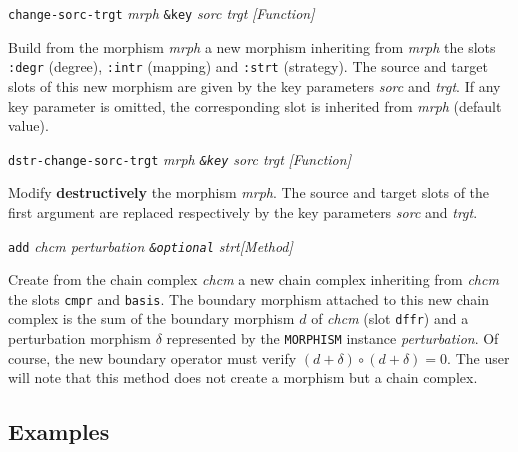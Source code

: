 \newpage
{\parindent=0mm
{\leftskip=5mm 
{\tt change-sorc-trgt} {\em mrph} {\tt \&key} {\em sorc trgt} \hfill {\em [Function]} \par}
{\leftskip=15mm 
Build from the morphism {\em mrph} a new morphism inheriting from
{\em mrph} the slots {\tt :degr} (degree), {\tt :intr} (mapping) and 
{\tt :strt} (strategy). The source  and target slots of this new morphism are given
by the key parameters {\em sorc} and {\em trgt}. If any 
key parameter is omitted, the corresponding slot is
inherited from {\em mrph} (default value). \par}
{\leftskip=5mm 
{\tt dstr-change-sorc-trgt} {\em mrph {\tt \&key}  sorc trgt} \hfill {\em [Function]} \par}
{\leftskip=15mm 
Modify {\bf destructively} the morphism {\em mrph}. The source  and target slots of the first argument
are replaced respectively by the key parameters {\em sorc} and {\em trgt}. \par}
{\leftskip=5mm 
{\tt add} {\em chcm perturbation {\tt \&optional} strt}\hfill {\em [Method]} \par}
{\leftskip=15mm 
Create from the chain complex {\em chcm} a new chain complex inheriting
from {\em chcm} the slots {\tt cmpr} and {\tt basis}. The boundary morphism
attached to this new chain complex  is the sum of the boundary morphism $d$
of {\em chcm} (slot {\tt dffr}) and a perturbation morphism $\delta$ represented by
the {\tt MORPHISM} instance {\em perturbation}. Of course, the new boundary operator
must verify $(d+\delta)\circ (d+\delta)=0$. The user will note that this method
does not create a morphism but a chain complex.\par}
}

\newpage

\subsection*{Examples}

